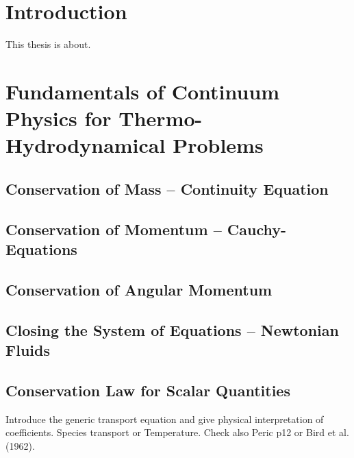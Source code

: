 \documentclass[article,type=msc,colorback,accentcolor=tud2a]{tudthesis}
\begin{document}
  \author{Fabian Nuraddin Alexander Gabel}
  \makethesistitle
  \tableofcontents

\printnomenclature
  \section{Introduction}

  This thesis is about. 

  \section{Fundamentals of Continuum Physics for Thermo-Hydrodynamical Problems}

    \subsection{Conservation of Mass -- Continuity Equation}
    \subsection{Conservation of Momentum -- Cauchy-Equations}
    \subsection{Conservation of Angular Momentum}
    \subsection{Closing the System of Equations -- Newtonian Fluids}
    \subsection{Conservation Law for Scalar Quantities}
        Introduce the generic transport equation and give physical interpretation of coefficients. Species transport or Temperature.
        Check also Peric p12 or Bird et al. (1962).
\end{document}
